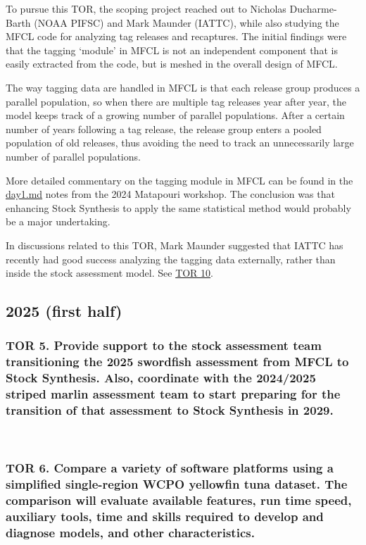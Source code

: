 \documentclass{SCreport}
\newcommand\blob
{https://github.com/PacificCommunity/ofp-sam-transition-plan/blob/main}
\begin{document}
\vspace{0.5ex}

To pursue this TOR, the scoping project reached out to Nicholas Ducharme-Barth
(NOAA PIFSC) and Mark Maunder (IATTC), while also studying the MFCL code for
analyzing tag releases and recaptures. The initial findings were that the
tagging `module' in MFCL is not an independent component that is easily
extracted from the code, but is meshed in the overall design of MFCL.

The way tagging data are handled in MFCL is that each release group produces a
parallel population, so when there are multiple tag releases year after year,
the model keeps track of a growing number of parallel populations. After a
certain number of years following a tag release, the release group enters a
pooled population of old releases, thus avoiding the need to track an
unnecessarily large number of parallel populations.

More detailed commentary on the tagging module in MFCL can be found in the
\href{\blob/workshops/2024-08-matapouri/notes/day1.md}{day1.md} notes from the
2024 Matapouri workshop. The conclusion was that enhancing Stock Synthesis to
apply the same statistical method would probably be a major undertaking.

In discussions related to this TOR, Mark Maunder suggested that IATTC has
recently had good success analyzing the tagging data externally, rather than
inside the stock assessment model. See \hyperlink{link:tagging-index}{TOR 10}.

\vspace{1ex}

\subsection{2025 (first half)}

\subsubsection{TOR 5. Provide support to the stock assessment team transitioning
  the 2025 swordfish assessment from MFCL to Stock Synthesis. Also, coordinate
  with the 2024/2025 striped marlin assessment team to start preparing for the
  transition of that assessment to Stock Synthesis in 2029.}

~

\subsubsection{TOR 6. Compare a variety of software platforms using a simplified
  single-region WCPO yellowfin tuna dataset. The comparison will evaluate
  available features, run time speed, auxiliary tools, time and skills required
  to develop and diagnose models, and other characteristics.}
\end{document}
